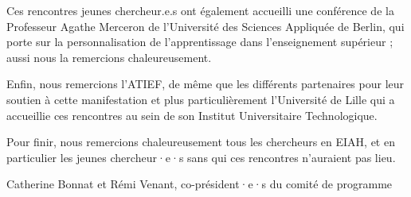 Ces rencontres jeunes chercheur.e.s ont également accueilli une conférence de la Professeur Agathe Merceron de l'Université des Sciences Appliquée de Berlin, qui porte sur la personnalisation de l’apprentissage dans l’enseignement supérieur ; aussi nous la remercions chaleureusement.

Enfin, nous remercions l’ATIEF, de même que les différents partenaires pour leur soutien à cette manifestation et plus particulièrement l’Université de Lille qui a accueillie ces rencontres au sein de son Institut Universitaire Technologique.

Pour finir, nous remercions chaleureusement tous les chercheurs en EIAH, et en particulier les jeunes chercheur·e·s sans qui ces rencontres n’auraient pas lieu.

\vspace*{2em}
\begin{flushright}
	Catherine Bonnat et Rémi Venant, co-président·e·s du comité de programme
\end{flushright}